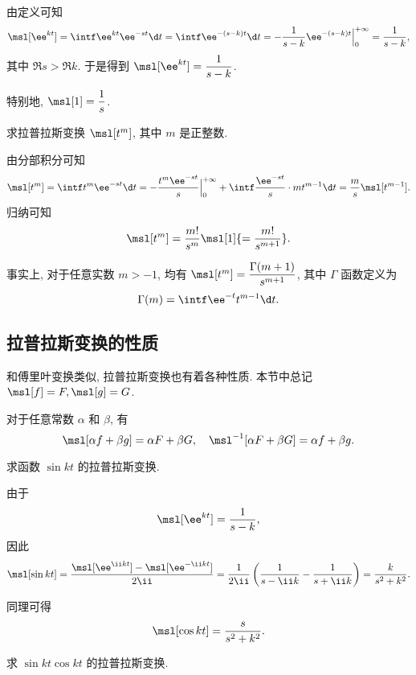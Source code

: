 \begin{solution}
  由定义可知
  \[
     \msl[\ee^{kt}]
    =\intf\ee^{kt}\ee^{-st}\d t
    =\intf\ee^{-(s-k)t}\d t
    =-\frac1{s-k}\ee^{-(s-k)t}\Big|_0^{+\infty}
    =\frac1{s-k},
  \]
  其中 $\Re s>\Re k$.
  于是得到 $\msl[\ee^{kt}]=\dfrac1{s-k}$.
\end{solution}

特别地, $\msl[1]=\dfrac1s$.

\begin{example}
  求拉普拉斯变换 $\msl[t^m]$, 其中 $m$ 是正整数.
\end{example}

\begin{solution}
  由分部积分可知
  \[
     \msl[t^m]
    =\intf t^m\ee^{-st}\d t
    =-\frac{t^m\ee^{-st}}s\Big|_0^{+\infty}+\intf\frac{\ee^{-st}}s\cdot mt^{m-1}\d t
    =\frac ms\msl[t^{m-1}].
  \]
  归纳可知
  \[
    \msl[t^m]=\dfrac{m!}{s^m}\msl[1]{=\dfrac{m!}{s^{m+1}}}.
  \]
\end{solution}

事实上, 对于任意实数 $m>-1$, 均有 $\msl[t^m]=\dfrac{\Gamma(m+1)}{s^{m+1}}$, 其中 $\Gamma$ 函数定义为
\[
  \Gamma(m)=\intf \ee^{-t}t^{m-1}\d t.
\]

\subsection{拉普拉斯变换的性质}

和傅里叶变换类似, 拉普拉斯变换也有着各种性质.
本节中总记 $\msl[f]=F,\msl[g]=G$.

\begin{theorem}[线性性质]
  对于任意常数 $\alpha$ 和 $\beta$, 有
  \[
    \msl[\alpha f+\beta g]=\alpha F+\beta G,\quad
    \msl^{-1}[\alpha F+\beta G]=\alpha f+\beta g.
  \]
\end{theorem}

\begin{example}
  求函数 $\sin{kt}$ 的拉普拉斯变换.
\end{example}

\begin{solution}
  由于
  \[
    \msl[\ee^{kt}]=\frac1{s-k},
  \]
  因此
  \[
     \msl[\sin{kt}]
    =\frac{\msl[\ee^{\ii kt}]-\msl[\ee^{-\ii kt}]}{2\ii }
    =\frac1{2\ii }\left(\frac1{s-\ii k}-\frac1{s+\ii k}\right)
    =\frac k{s^2+k^2}.
  \]
\end{solution}

同理可得
\[
  \msl[\cos kt]=\frac{s}{s^2+k^2}.
\]

\begin{exercise}
  求 $\sin{kt}\cos{kt}$ 的拉普拉斯变换.
\end{exercise}

